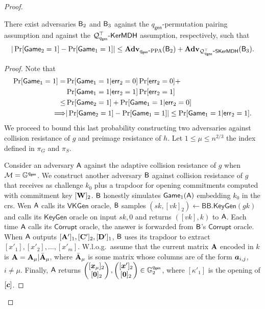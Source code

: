 \begin{proof}
\begin{lemma} There exist adversaries $\mathsf{B}_2$ and $\mathsf{B}_3$ against the ${q_\mathsf{gen}}$-permutation pairing assumption and against the $\mathcal{Q}^\top_{{q_\mathsf{gen}}}\mbox{-}\mathsf{KerMDH}$ assumption, respectively, such that
$$
|\Pr[\mathsf{Game}_2=1]-\Pr[\mathsf{Game}_1=1]|\leq \mathbf{Adv}_{{q_\mathsf{gen}}\mbox{-}\mathrm{PPA}}(\mathsf{B}_2)+\mathbf{Adv}_{\mathcal{Q}^\top_{{q_\mathsf{gen}}}\mbox{-}\mathsf{SKerMDH}}(\mathsf{B}_3).
$$\label{lemma:fin}
\end{lemma}
\begin{proof}
Note that
\begin{align*}
\Pr[\mathsf{Game}_1=1]
 = &\Pr[\mathsf{Game}_1=1|\mathsf{err}_2=0]\Pr[\mathsf{err}_2=0]+\\
&\Pr[\mathsf{Game}_1=1|\mathsf{err}_2=1]\Pr[\mathsf{err}_2=1]\\
 \leq& \Pr[\mathsf{Game}_2=1] + \Pr[\mathsf{Game}_1=1|\mathsf{err}_2=0]\\
\Longrightarrow  &|\Pr[\mathsf{Game}_2=1]-\Pr[\mathsf{Game}_1=1]|\leq \Pr[\mathsf{Game}_1=1|\mathsf{err}_2=1].
\end{align*}
We proceed to bound this last probability constructing two adversaries against collision resistance of $g$ and preimage resistance of $h$. Let $1\leq \mu\leq n^{2/3}$ the index defined in $\pi_G$ and $\pi_S$.


Consider an adversary $\mathsf{A}$ against the adaptive collision resistance of $g$ when $\mathcal{M}=\mathbb{G}^{q_\mathsf{gen}}$. We construct another adversary $\mathsf{B}$ against collision resistance of $g$ that receives as challenge $k_0$ plus a trapdoor for opening commitments computed with commitment key $[\mathbf{{W}}]_2$. $\mathsf{B}$ honestly simulates $\mathsf{Game}_1(\mathsf{A})$ embedding $k_0$ in the crs. Wen $\mathsf{A}$ calls its $\mathsf{VKGen}$ oracle, $\mathsf{B}$ samples $(sk,[vk]_2)\gets\mathsf{BB}.\mathsf{KeyGen}(gk)$ and calls its $\mathsf{KeyGen}$ oracle on input $sk,0$ and returns $([vk],k)$ to $\mathsf{A}$. Each time $\mathsf{A}$ calls its $\mathsf{Corrupt}$ oracle, the answer is forwarded from $\mathsf{B}$'s  $\mathsf{Corrupt}$ oracle.
When $\mathsf{A}$ outputs $[\mathbf{{A}}']_1,[\mathbf{{C}}']_2,[\mathbf{{D}}']_1$, $\mathsf{B}$ uses its trapdoor to extract $[x'_1],[x'_2],\ldots,[x'_m]$. W.l.o.g.~\allowbreak assume that the current matrix $\mathbf{{A}}$ encoded in $k$ is $\mathbf{{A}}=\mathbf{{A}}_\mu|\bar{\mathbf{{A}}}_\mu$, where $\bar{\mathbf{{A}}}_\mu$ is some matrix whose columns are of the form ${\boldsymbol{a}}_{i,j}$, $i\neq \mu$. Finally, $\mathsf{A}$ returns
$\left(\begin{matrix}
	{[{\boldsymbol{x}}_\mu]_2}\\
	{[{\boldsymbol{0}}]_2}\end{matrix}\right),
\left(\begin{matrix}
	{[{\boldsymbol{x}}']_2}\\
	{[{\boldsymbol{0}}]_2}\end{matrix}\right)
\in\mathbb{G}^{q_\mathsf{gen}}_2$,
where $[\kappa'_1]$ is the opening of $[{\boldsymbol{c}}]$.


\end{proof}
\end{proof}
